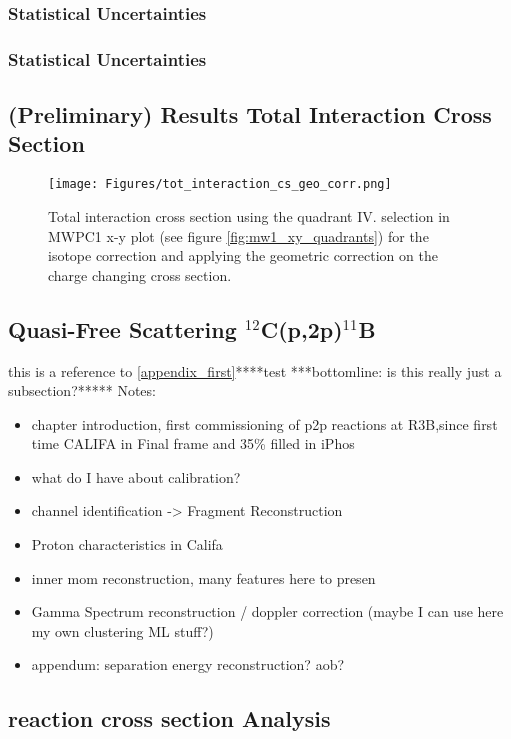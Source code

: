\subsubsection{Statistical Uncertainties}


\subsubsection{Statistical Uncertainties}


\subsection{(Preliminary) Results Total Interaction Cross Section}
\begin{figure}[h!]
    \centering
    \texttt{[image: Figures/tot\_interaction\_cs\_geo\_corr.png]}
    \caption{
	Total interaction cross section using the quadrant IV. selection in MWPC1 x-y plot (see figure \ref{fig:mw1_xy_quadrants}) for the isotope correction and applying the geometric correction on the charge changing cross section.}
    \label{fig:tot_interaction_cs}
\end{figure}
\subsection{Quasi-Free Scattering $^{12}$C(p,2p)$^{11}$B}
this is  a reference to \ref{appendix_first}****test
***bottomline: is this really just a subsection?*****
Notes:\newline
\begin{itemize}
\item chapter introduction, first commissioning of p2p reactions at R3B,since first time CALIFA in Final frame and 35\% filled in iPhos
\item what do I have about calibration?
\item channel identification -> Fragment Reconstruction
\item Proton characteristics in Califa
\item inner mom reconstruction, many features here to presen
\item Gamma Spectrum reconstruction / doppler correction (maybe I can use here my own clustering ML stuff?)
\item appendum: separation energy reconstruction? aob? 
\end{itemize}



\subsection{reaction cross section Analysis}

